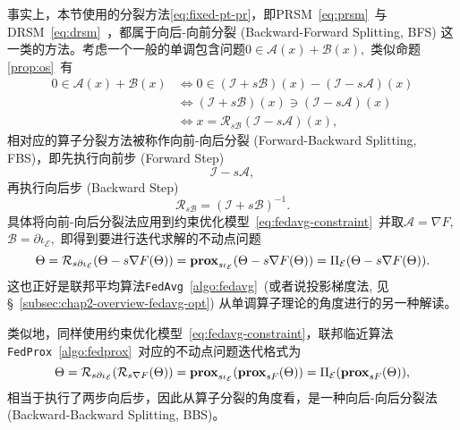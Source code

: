事实上，本节使用的分裂方法\eqref{eq:fixed-pt-pr}，即PRSM~\eqref{eq:prsm}~与DRSM~\eqref{eq:drsm}~，都属于向后-向前分裂 (Backward-Forward Splitting, BFS) 这一类的方法。考虑一个一般的单调包含问题$0 \in \mathcal{A}(x) + \mathcal{B}(x),$ 类似命题\ref{prop:os}~有\cite{ryu2022large}
\begin{align*}
0 \in \mathcal{A}(x) + \mathcal{B}(x) & \Longleftrightarrow 0 \in (\mathcal{I} + s\mathcal{B})(x) - (\mathcal{I} - s\mathcal{A})(x) \\
& \Longleftrightarrow (\mathcal{I} + s\mathcal{B})(x) \ni (\mathcal{I} - s\mathcal{A})(x) \\
& \Longleftrightarrow x = \mathcal{R}_{s\mathcal{B}}(\mathcal{I} - s\mathcal{A})(x),
\end{align*}
相对应的算子分裂方法被称作向前-向后分裂 (Forward-Backward Splitting, FBS)，即先执行向前步 (Forward Step)
\begin{equation}
\label{eq:forward_step}
\mathcal{I} - s\mathcal{A},
\end{equation}
再执行向后步 (Backward Step)
\begin{equation}
\label{eq:backward_step}
\mathcal{R}_{s\mathcal{B}} = (\mathcal{I} + s\mathcal{B})^{-1}.
\end{equation}
具体将向前-向后分裂法应用到约束优化模型~\eqref{eq:fedavg-constraint}~并取$\mathcal{A} = \nabla F,$ $\mathcal{B} = \partial \iota_{\mathcal{E}},$ 即得到要进行迭代求解的不动点问题
\begin{equation}
\label{eq:fedavg-fpi}
\Theta = \mathcal{R}_{s\partial\iota_{\mathcal{E}}}(\Theta - s\nabla F(\Theta)) = \mathbf{prox}_{s\iota_{\mathcal{E}}}(\Theta - s\nabla F(\Theta)) = \Pi_{\mathcal{E}}(\Theta - s\nabla F(\Theta)).
\end{equation}
这也正好是联邦平均算法\texttt{FedAvg}~\ref{algo:fedavg}~(或者说投影梯度法, 见\S~\ref{subsec:chap2-overview-fedavg-opt}) 从单调算子理论的角度进行的另一种解读\cite{Malekmohammadi_2021_fl_os}。

类似地，同样使用约束优化模型~\eqref{eq:fedavg-constraint}，联邦临近算法\texttt{FedProx}~\ref{algo:fedprox}~对应的不动点问题迭代格式为
\begin{equation}
\label{eq:fedprox-fpi}
\Theta = \mathcal{R}_{s\partial\iota_{\mathcal{E}}}(\mathcal{R}_{s\nabla F}(\Theta)) = \mathbf{prox}_{s\iota_{\mathcal{E}}}(\mathbf{prox}_{sF}(\Theta)) = \Pi_{\mathcal{E}}(\mathbf{prox}_{sF}(\Theta)),
\end{equation}
相当于执行了两步向后步，因此从算子分裂的角度看，是一种向后-向后分裂法 (Backward-Backward Splitting, BBS)。

